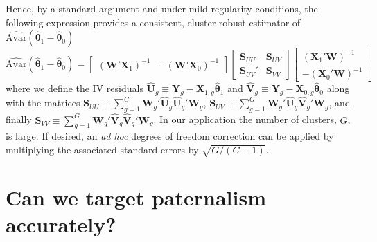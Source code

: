 \begin{appendix}
Hence, by a standard argument and under mild regularity conditions, the following expression provides a consistent, cluster robust estimator of $\widehat{\text{Avar}}(\widehat{\boldsymbol{\theta}}_1 - \widehat{\boldsymbol{\theta}}_0)$ 
\[
\widehat{\text{Avar}}(\widehat{\boldsymbol{\theta}}_1 - \widehat{\boldsymbol{\theta}}_0) 
= \begin{bmatrix}
\left(\mathbf{W}'\mathbf{X}_1\right)^{-1} &
-\left(\mathbf{W}'\mathbf{X}_0\right)^{-1} 
\end{bmatrix}
\begin{bmatrix}
\mathbf{S}_{UU}& \mathbf{S}_{UV}\\
\mathbf{S}_{UV}'& \mathbf{S}_{VV}
\end{bmatrix} 
\begin{bmatrix}
\left(\mathbf{X}_1'\mathbf{W}\right)^{-1} \\
-\left(\mathbf{X}_0'\mathbf{W}\right)^{-1} 
\end{bmatrix}
\]
where we define the IV residuals
$\widehat{\mathbf{U}}_g \equiv \mathbf{Y}_g - \mathbf{X}_{1,g}\widehat{\boldsymbol{\theta}}_1$ and
$\widehat{\mathbf{V}}_g \equiv \mathbf{Y}_g - \mathbf{X}_{0,g}\widehat{\boldsymbol{\theta}}_0$ along with the matrices
$\mathbf{S}_{UU} \equiv \sum_{g=1}^G \mathbf{W}_g' \widehat{\mathbf{U}}_g \widehat{\mathbf{U}}_g' \mathbf{W}_g$,
$\mathbf{S}_{UV} \equiv \sum_{g=1}^G \mathbf{W}_g' \widehat{\mathbf{U}}_g \widehat{\mathbf{V}}_g' \mathbf{W}_g$, and finally
$\mathbf{S}_{VV} \equiv \sum_{g=1}^G \mathbf{W}_g' \widehat{\mathbf{V}}_g \widehat{\mathbf{V}}_g' \mathbf{W}_g$.
In our application the number of clusters, $G$, is large.
If desired, an \emph{ad hoc} degrees of freedom correction can be applied by multiplying the associated standard errors by $\sqrt{G/(G-1)}$.

\section{Can we target paternalism accurately?} \label{targeting}


\end{appendix}
